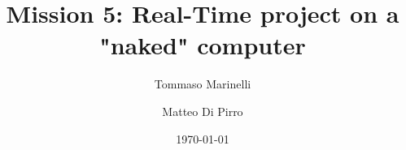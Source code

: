 \documentclass[a4paper,10pt]{article}
\begin{document}
\title{Mission 5: Real-Time project on a "naked" computer}
\author{Tommaso Marinelli \and Matteo Di Pirro}
\date{\today}

\maketitle





\end{document}
